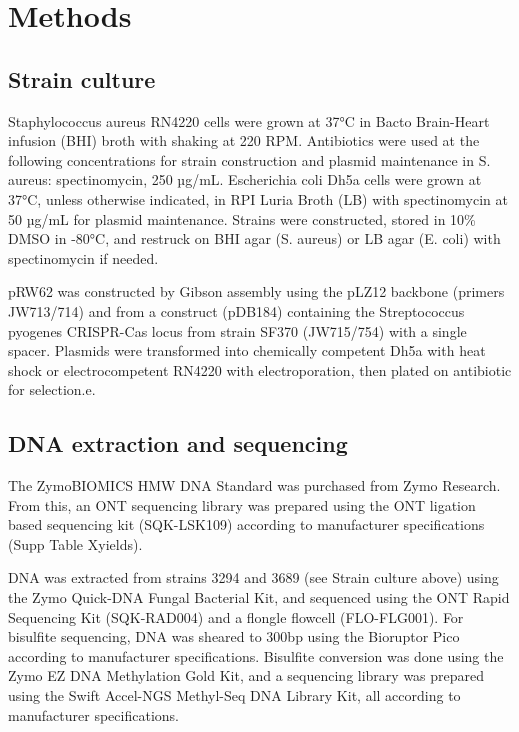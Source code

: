 \section{Methods}
\label{sec:methods}

\subsection{Strain culture}
\label{sec:methods}

Staphylococcus aureus RN4220 cells were grown at 37°C in Bacto Brain-Heart infusion (BHI) broth with shaking at 220 RPM. Antibiotics were used at the following concentrations for strain construction and plasmid maintenance in S. aureus: spectinomycin, 250 µg/mL. Escherichia coli Dh5a cells were grown at 37°C, unless otherwise indicated, in RPI Luria Broth (LB) with spectinomycin at 50 µg/mL for plasmid maintenance. Strains were constructed, stored in 10\% DMSO in -80°C, and restruck on BHI agar (S. aureus) or LB agar (E. coli) with spectinomycin if needed.

pRW62 was constructed by Gibson assembly using the pLZ12 backbone (primers JW713/714) and from a construct (pDB184) containing the Streptococcus pyogenes CRISPR-Cas locus from strain SF370 (JW715/754) with a single spacer. Plasmids were transformed into chemically competent Dh5a with heat shock or electrocompetent RN4220 with electroporation, then plated on antibiotic for selection.e.

\subsection{DNA extraction and sequencing}
\label{sec:methods}

The ZymoBIOMICS HMW DNA Standard was purchased from Zymo Research. From this, an ONT sequencing library was prepared using the ONT ligation based sequencing kit (SQK-LSK109) according to manufacturer specifications (Supp Table Xyields).

DNA was extracted from strains 3294 and 3689 (see Strain culture above) using the Zymo Quick-DNA Fungal Bacterial Kit, and sequenced using the ONT Rapid Sequencing Kit (SQK-RAD004) and a flongle flowcell (FLO-FLG001). For bisulfite sequencing, DNA was sheared to 300bp using the Bioruptor Pico according to manufacturer specifications. Bisulfite conversion was done using the Zymo EZ DNA Methylation Gold Kit, and a sequencing library was prepared using the Swift Accel-NGS Methyl-Seq DNA Library Kit, all according to manufacturer specifications.

